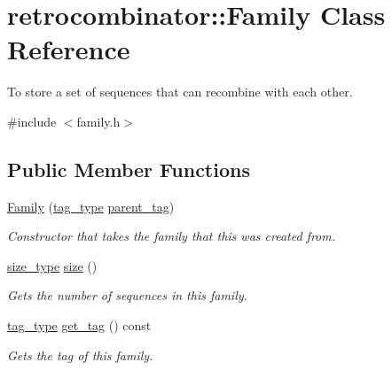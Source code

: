 \hypertarget{classretrocombinator_1_1Family}{}\section{retrocombinator\+:\+:Family Class Reference}
\label{classretrocombinator_1_1Family}


To store a set of sequences that can recombine with each other.  




{\ttfamily \#include $<$family.\+h$>$}

\subsection*{Public Member Functions}
\begin{DoxyCompactItemize}
\item 
\hyperlink{classretrocombinator_1_1Family_aefb8619ac695a3ad8e654ed8302668ee}{Family} (\hyperlink{constants_8h_afd7c6eb4293e8c4d12827609a9a34b9b}{tag\+\_\+type} \hyperlink{classretrocombinator_1_1Family_aa5885cd6d63468db43859a860f7f16b4}{parent\+\_\+tag})
\begin{DoxyCompactList}\small\item\em Constructor that takes the family that this was created from. \end{DoxyCompactList}\item 
\mbox{\label{classretrocombinator_1_1Family_a0b767536f3a583fbeb77cadcdc1479b2}} 
\hyperlink{constants_8h_a8e1541b50cee66a791df4c437ccbb385}{size\+\_\+type} \hyperlink{classretrocombinator_1_1Family_a0b767536f3a583fbeb77cadcdc1479b2}{size} ()
\begin{DoxyCompactList}\small\item\em Gets the number of sequences in this family. \end{DoxyCompactList}\item 
\mbox{\label{classretrocombinator_1_1Family_a11eab2ee12f8291620b230568ac3ab59}} 
\hyperlink{constants_8h_afd7c6eb4293e8c4d12827609a9a34b9b}{tag\+\_\+type} \hyperlink{classretrocombinator_1_1Family_a11eab2ee12f8291620b230568ac3ab59}{get\+\_\+tag} () const
\begin{DoxyCompactList}\small\item\em Gets the tag of this family. \end{DoxyCompactList}\item 

\end{DoxyCompactItemize}
